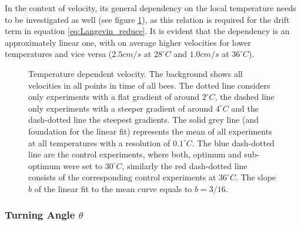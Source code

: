 In the context of velocity, its general dependency on the local temperature needs to be investigated as well (see figure \ref{fig:vel_vs_dT}), as this relation is required for the drift term in equation \ref{eq:Langevin_reduce}. It is evident that the dependency is an approximately linear one, with on average higher velocities for lower temperatures and vice versa ($2.5cm/s$ at $28^{\circ}C$ and $1.0cm/s$ at $36^{\circ}C$).

\begin{figure}%
    \centering
    \caption{Temperature dependent velocity. The background shows all velocities in all points in time of all bees. The dotted line considers only experiments with a flat gradient of around $2^{\circ}C$, the dashed line only experiments with a steeper gradient of around $4^{\circ}C$ and the dash-dotted line the steepest gradients. The solid grey line (and foundation for the linear fit) represents the mean of all experiments at all temperatures with a resolution of $0.1^{\circ}C$. The blue dash-dotted line are the control experiments, where both, optimum and sub-optimum were set to $30^{\circ}C$, similarly the red dash-dotted line consists of the corresponding control experiments at $36^{\circ}C$. The slope $b$ of the linear fit to the mean curve equals to $b=3/16$.}
    \label{fig:vel_vs_dT}
\end{figure}

\subsubsection{Turning Angle $\theta$}

